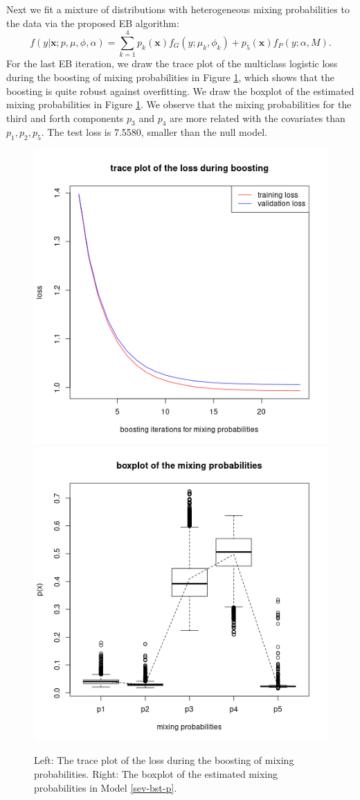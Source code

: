 \documentclass[11pt]{article}
\numberwithin{equation}{section}
\def\bx{\boldsymbol{x}}
\begin{document}
Next we fit a mixture of distributions with heterogeneous mixing probabilities to the data via the proposed EB algorithm:
\begin{equation}\label{sev-bst-p}
f(y|\bx;p,\mu,\phi,\alpha)=\sum_{k=1}^4p_k(\bx)f_{G}(y;\mu_k,\phi_k)+p_5(\bx)f_{P}(y;\alpha,M).
\end{equation}
For the last EB iteration, we draw the trace plot of the multiclass logistic loss during the boosting of mixing probabilities in Figure \ref{bx-bst-p}, which shows that the boosting is quite robust against overfitting.
We draw the boxplot of the estimated mixing probabilities in Figure \ref{bx-bst-p}.
We observe that the mixing probabilities for the third and forth components $p_3$ and $p_4$ are more related with the covariates than $p_1,p_2,p_5$.
The test loss is  7.5580, smaller than the null model.
	\begin{figure}[htp!]
		\centering
				\includegraphics[width=0.4\linewidth]{../plots/sev/bst_p_trace}
		\includegraphics[width=0.4\linewidth]{../plots/sev/bst_p}
		\caption{Left: The trace plot of the loss during the boosting of mixing probabilities. Right: The boxplot of the estimated mixing probabilities in Model \eqref{sev-bst-p}.}\label{bx-bst-p}
	\end{figure}
\end{document}
